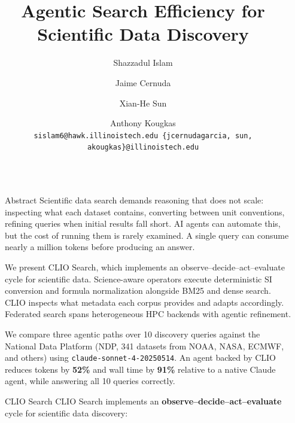 \documentclass[final]{beamer}
\title{Agentic Search Efficiency for Scientific Data Discovery}
\author{Shazzadul Islam \and Jaime Cernuda \and Xian-He Sun \and Anthony Kougkas \\[0.3ex]
\texttt{sislam6@hawk.illinoistech.edu \quad \{jcernudagarcia, sun, akougkas\}@illinoistech.edu}}
\newlength{\sepwidth}
\newlength{\colwidth}
\newcommand{\separatorcolumn}{\begin{column}{\sepwidth}\end{column}}
\begin{document}
\setcounter{figure}{0}

\begin{frame}[t]

\begin{columns}[t]

\separatorcolumn

\begin{column}{\colwidth}

  \begin{block}{Abstract}
    \justifying
    Scientific data search demands reasoning that does not scale:
    inspecting what each dataset contains, converting between unit
    conventions, refining queries when initial results fall short. AI
    agents can automate this, but the cost of running them is rarely
    examined. A single query can consume nearly a million tokens before
    producing an answer.

    \vspace{0.5em}
    We present CLIO Search, which implements an
    observe--decide--act--evaluate cycle for scientific data.
    Science-aware operators execute deterministic SI conversion and
    formula normalization alongside BM25 and dense search. CLIO inspects
    what metadata each corpus provides and adapts accordingly. Federated
    search spans heterogeneous HPC backends with agentic refinement.

    \vspace{0.5em}
    We compare three agentic paths over 10 discovery queries against the
    National Data Platform (NDP, 341 datasets from NOAA, NASA, ECMWF,
    and others) using \texttt{claude-sonnet-4-20250514}. An agent backed
    by CLIO reduces tokens by \textbf{52\%} and wall time by
    \textbf{91\%} relative to a native Claude agent, while answering
    all 10 queries correctly.
  \end{block}


  \begin{block}{CLIO Search}
    \justifying
    CLIO Search implements an \textbf{observe--decide--act--evaluate}
    cycle for scientific data discovery:


\end{block}
\end{column}
\end{columns}
\end{frame}
\end{document}
